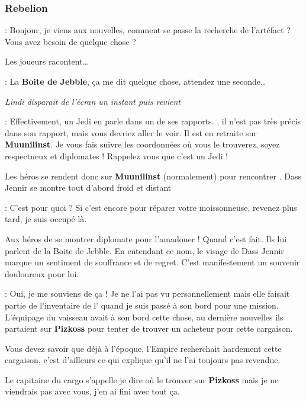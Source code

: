 \subsubsection{Rebelion}
\begin{quotebox}
    : Bonjour, je viens aux nouvelles, comment se passe la recherche de l’artéfact ? Vous avez besoin de quelque chose ?
\end{quotebox}

Les joueurs racontent\ldots

\begin{quotebox}
    : La \textbf{Boite de Jebble}, ça me dit quelque chose, attendez une seconde\ldots 

    \textit{Lindi disparait de l’écran un instant puis revient}

    : Effectivement, un Jedi en parle dans un de ses rapports. , il n’est pas très précis dans son rapport, mais vous devriez aller le voir. Il est en retraite sur \textbf{Muunilinst}. Je vous fais suivre les coordonnées où vous le trouverez, soyez respectueux et diplomates ! Rappelez vous que c’est un Jedi !
\end{quotebox}

Les héros se rendent donc sur \textbf{Muunilinst} (normalement) pour rencontrer . Dass Jennir se montre tout d’abord froid et distant
\begin{quotebox}
    : C’est pour quoi ? Si c’est encore pour réparer votre moissonneuse, revenez plus tard, je suis occupé là.
\end{quotebox}

Aux héros de se montrer diplomate pour l’amadouer ! Quand c’est fait. Ils lui parlent de la Boite de Jebble. En entendant ce nom, le visage de Dass Jennir marque un sentiment de souffrance et de regret. C’est manifestement un souvenir douloureux pour lui.
\begin{quotebox}
    : Oui, je me souviens de ça ! Je ne l’ai pas vu personnellement mais elle faisait partie de l’inventaire de l’ quand je suis passé à son bord pour une mission. L’équipage du vaisseau avait à son bord cette chose, au dernière nouvelles ils partaient sur \textbf{Pizkoss} pour tenter de trouver un acheteur pour cette cargaison.

    Vous devez savoir que déjà à l’époque, l’Empire recherchait hardement cette cargaison, c’est d’ailleurs ce qui explique qu’il ne l’ai toujours pas revendue. 

    Le capitaine du cargo s’appelle  je dire où le trouver sur \textbf{Pizkoss} mais je ne viendrais pas avec vous, j’en ai fini avec tout ça.
\end{quotebox}


